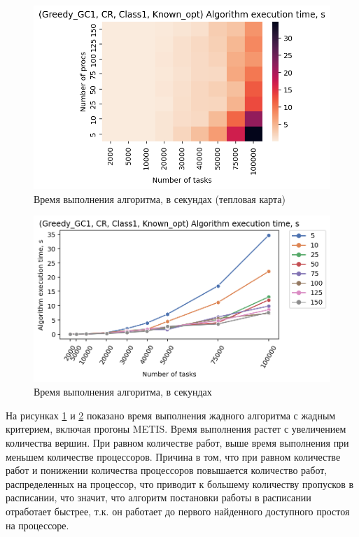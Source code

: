 \begin{figure}[!htbp]
    \centering
    \includegraphics[width=\textwidth]{imgs/ideal_1/CR/et_heatmap.png}
    \caption{Время выполнения алгоритма, в секундах (тепловая карта)}
    \label{fig:CR-exec-time-heatmap}
\end{figure}

\begin{figure}[!htbp]
    \centering
    \includegraphics[width=\textwidth]{imgs/ideal_1/CR/tr_graph.png}
    \caption{Время выполнения алгоритма, в секундах}
    \label{fig:CR-exec-time-compiled}
\end{figure}

На рисунках \ref{fig:CR-exec-time-heatmap} и \ref{fig:CR-exec-time-compiled} показано время выполнения жадного алгоритма с жадным критерием, включая прогоны METIS. Время выполнения растет с увеличением количества вершин. При равном количестве работ, выше время выполнения при меньшем количестве процессоров. Причина в том, что при равном количестве работ и понижении количества процессоров повышается количество работ, распределенных на процессор, что приводит к большему количеству пропусков в расписании, что значит, что алгоритм постановки работы в расписании отработает быстрее, т.к. он работает до первого найденного доступного простоя на процессоре. 

